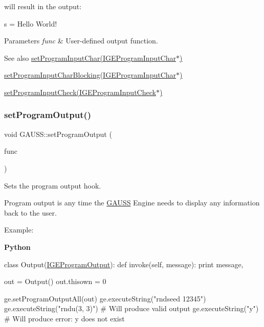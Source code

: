 will result in the output\+: 
\begin{DoxyCode}
s = Hello World!
\end{DoxyCode}



\begin{DoxyParams}{Parameters}
{\em func} & User-\/defined output function.\\
\hline
\end{DoxyParams}
\begin{DoxySeeAlso}{See also}
\hyperlink{class_g_a_u_s_s_a71a60afb143ae00b18d6fe3fd99f316d}{set\+Program\+Input\+Char(\+I\+G\+E\+Program\+Input\+Char$\ast$)} 

\hyperlink{class_g_a_u_s_s_a300d6e33dbfd2a45f56ff2769f585435}{set\+Program\+Input\+Char\+Blocking(\+I\+G\+E\+Program\+Input\+Char$\ast$)} 

\hyperlink{class_g_a_u_s_s_a6517b404cf71d157808a1cb73e3c0ddb}{set\+Program\+Input\+Check(\+I\+G\+E\+Program\+Input\+Check$\ast$)} 
\end{DoxySeeAlso}
\mbox{\label{class_g_a_u_s_s_a7f0dc6b5b307aa06c347f9c6a9fdacab}} 
\subsubsection{\texorpdfstring{set\+Program\+Output()}{setProgramOutput()}}
{\footnotesize\ttfamily void G\+A\+U\+S\+S\+::set\+Program\+Output (\begin{DoxyParamCaption}\item[{\hyperlink{class_i_g_e_program_output}{I\+G\+E\+Program\+Output} $\ast$}]{func }\end{DoxyParamCaption})\hspace{0.3cm}{\ttfamily [static]}}



Sets the program output hook. 

Program output is any time the \hyperlink{class_g_a_u_s_s}{G\+A\+U\+SS} Engine needs to display any information back to the user.

Example\+:

{\bfseries Python} 
\begin{DoxyCode}
\textcolor{keyword}{class }Output(\hyperlink{class_i_g_e_program_output}{IGEProgramOutput}):
    \textcolor{keyword}{def }invoke(self, message):
        \textcolor{keywordflow}{print} message,

out = Output()
out.thisown = 0

ge.setProgramOutputAll(out)
ge.executeString(\textcolor{stringliteral}{"rndseed 12345"})
ge.executeString(\textcolor{stringliteral}{"rndu(3, 3)"})  \textcolor{comment}{# Will produce valid output}
ge.executeString(\textcolor{stringliteral}{"y"})           \textcolor{comment}{# Will produce error: y does not exist}
\end{DoxyCode}


